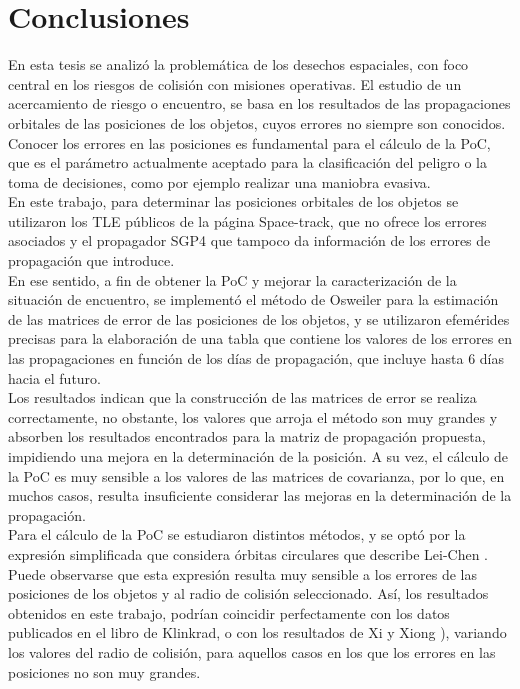  \chapter{Conclusiones}
\label{chap:conclusiones}

En esta tesis se analiz\'o la problem\'atica de los desechos espaciales, con foco central en los riesgos de colisi\'on con misiones operativas. El estudio de un acercamiento de riesgo o encuentro, se basa en los resultados de las propagaciones orbitales de las posiciones de los objetos, cuyos errores no siempre son conocidos.\\

Conocer los errores en las posiciones es fundamental para el c\'alculo de la PoC, que es el par\'ametro actualmente aceptado para la clasificaci\'on del peligro o la toma de decisiones, como por ejemplo realizar una maniobra evasiva.\\ En este trabajo, para determinar las posiciones orbitales de los objetos se utilizaron los TLE p\'ublicos de la p\'agina Space-track, que no ofrece los errores asociados y el propagador SGP4 \citep{sgp4python} que tampoco da informaci\'on de los errores de propagaci\'on que introduce.\\

En ese sentido, a fin de obtener la PoC y mejorar la caracterizaci\'on de la situaci\'on de encuentro, se implement\'o el m\'etodo de Osweiler \citep{osweiler} para la estimaci\'on de las matrices de error de las posiciones de los objetos, y se utilizaron efem\'erides precisas para la elaboraci\'on de una tabla que contiene los valores de los errores en las propagaciones en funci\'on de los d\'ias de propagaci\'on, que incluye hasta 6 d\'ias hacia el futuro.\\

Los resultados indican que la construcci\'on de las matrices de error se realiza correctamente, no obstante, los valores que arroja el m\'etodo son muy grandes y absorben los resultados encontrados para la matriz de propagaci\'on propuesta, impidiendo una mejora en la determinaci\'on de la posici\'on.  A su vez, el c\'alculo de la PoC es muy sensible a los valores de las matrices de covarianza, por lo que, en muchos casos, resulta insuficiente considerar las mejoras en la determinaci\'on de la propagaci\'on.\\

Para el c\'alculo de la PoC se estudiaron distintos m\'etodos, y se opt\'o por la expresi\'on simplificada que considera \'orbitas circulares que describe Lei-Chen \citep{leichen}. Puede observarse que esta expresi\'on resulta muy sensible a los errores de las posiciones de los objetos y al radio de colisi\'on seleccionado. As\'i, los resultados obtenidos en este trabajo, podr\'ian coincidir perfectamente con los datos publicados en el libro de  Klinkrad, \citep{Klinkrad} o con los resultados de Xi y Xiong \citep{xu2014method}), variando los valores del radio de colisi\'on, para aquellos casos en los que los errores en las posiciones no son muy grandes.


